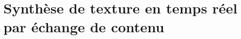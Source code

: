 \chapter[Synthèse par échange de contenu]{Synthèse de texture en temps réel par échange de contenu}
\label{chap:chapitre5}